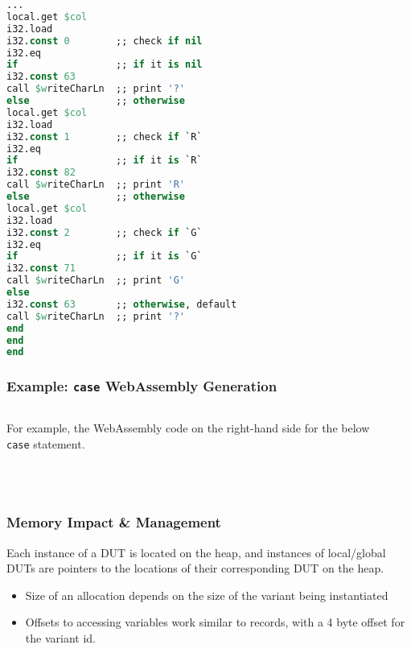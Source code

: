 \documentclass{beamer}
\begin{document}
\begin{lrbox}{\caseGenWat}
\begin{lstlisting}[language=Pascal,basicstyle=\tiny]
...
local.get $col
i32.load
i32.const 0        ;; check if nil
i32.eq
if                 ;; if it is nil
i32.const 63
call $writeCharLn  ;; print '?'
else               ;; otherwise
local.get $col
i32.load
i32.const 1        ;; check if `R`
i32.eq
if                 ;; if it is `R`
i32.const 82
call $writeCharLn  ;; print 'R'
else               ;; otherwise
local.get $col
i32.load
i32.const 2        ;; check if `G`
i32.eq
if                 ;; if it is `G`
i32.const 71
call $writeCharLn  ;; print 'G'
else
i32.const 63       ;; otherwise, default
call $writeCharLn  ;; print '?'
end
end
end
\end{lstlisting}
\end{lrbox}


\begin{frame}
 \frametitle{Example: \texttt{case} WebAssembly Generation}
    \begin{columns}[T,onlytextwidth]
        \begin{column}{.40\textwidth}
            \begin{minipage}{\textwidth}
                {\footnotesize For example, the WebAssembly code on the right-hand side for the below \texttt{case} statement.}
                \ \\ \ \\ \ \\
                \usebox{\caseGenCode}
            \end{minipage}
        \end{column}
        \begin{column}{.50\textwidth}
            \begin{minipage}{\textwidth}
                \usebox{\caseGenWat}
            \end{minipage}
        \end{column}
    \end{columns}
\end{frame}

\begin{frame}
\frametitle{Memory Impact \& Management}

Each instance of a DUT is located on the heap, and instances of local/global DUTs are pointers to the locations of their corresponding DUT on the heap.
\begin{itemize}
 \item <1-> Size of an allocation depends on the size of the variant being instantiated
 \item Offsets to accessing variables work similar to records, with a 4 byte offset for the variant id.
\end{itemize}

\begin{figure}
  
\end{figure}
\end{frame}
\end{document}
